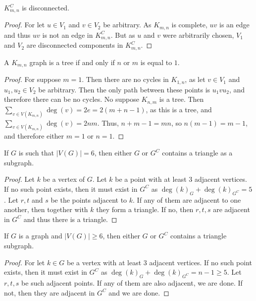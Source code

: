        \begin{theorem}
        $K_{m,n}^C$ is disconnected.
        \end{theorem}
        \begin{proof}
        For let $u\in V_1$ and $v\in V_2$ be arbitrary. As $K_{m,n}$ is complete, $uv$ is an edge and thus $uv$ is not an edge in $K_{m,n}^C$. But as $u$ and $v$ were arbitrarily chosen, $V_1$ and $V_2$ are disconnected components in $K_{m,n}^C$.
        \end{proof}
        \begin{theorem}
        A $K_{m,n}$ graph is a tree if and only if $n$ or $m$ is equal to $1$.
        \end{theorem}
        \begin{proof}
        For suppose $m=1$. Then there are no cycles in $K_{1,n}$, as let $v\in V_1$ and $u_1,u_2\in V_2$ be arbitrary. Then the only path between these points is $u_1 v u_2$, and therefore there can be no cycles. No suppose $K_{n,m}$ is a tree. Then $\sum_{v\in V(K_{m,n})}\deg(v) = 2e=2(m+n-1)$, as this is a tree, and $\sum_{v\in V(K_{m,n})}\deg(v) = 2nm$. Thus, $n+m-1=mn$, so $n(m-1)=m-1$, and therefore either $m=1$ or $n=1$.
        \end{proof}
        \begin{theorem}
        If $G$ is such that $|V(G)|=6$, then either $G$ or $G^C$ contains a triangle as a subgraph.
        \end{theorem}
        \begin{proof}
        Let $k$ be a vertex of $G$. Let $k$ be a point with at least $3$ adjacent vertices. If no such point exists, then it must exist in $G^C$ as $\deg(k)_G+\deg(k)_{G^C}=5$. Let $r,t$ and $s$ be the points adjacent to $k$. If any of them are adjacent to one another, then together with $k$ they form a triangle. If no, then $r,t,s$ are adjacent in $G^C$ and thus there is a triangle.
        \end{proof}
        \begin{corollary}
        If $G$ is a graph and $|V(G)|\geq 6$, then either $G$ or $G^C$ contains a triangle subgraph.
        \end{corollary}
        \begin{proof}
        For let $k\in G$ be a vertex with at least $3$ adjacent vertices. If no such point exists, then it must exist in $G^C$ as $\deg(k)_G+\deg(k)_{G^C} = n-1 \geq 5$. Let $r,t,s$ be such adjacent points. If any of them are also adjacent, we are done. If not, then they are adjacent in $G^C$ and we are done.
        \end{proof}
